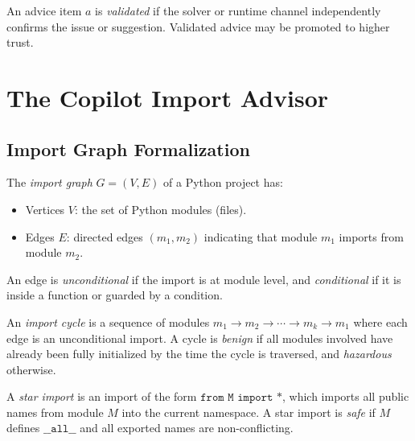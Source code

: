 \documentclass[11pt]{article}
\begin{document}
\begin{definition}
\label{def:validation}
An advice item $a$ is \emph{validated} if the solver or runtime
channel independently confirms the issue or suggestion.
Validated advice may be promoted to higher trust.
\end{definition}

\section{The Copilot Import Advisor}
\label{sec:import}

\subsection{Import Graph Formalization}
\label{sec:import:graph}

\begin{definition}
\label{def:import-graph}
The \emph{import graph} $G = (V, E)$ of a Python project has:
\begin{itemize}[leftmargin=2em]
\item Vertices $V$: the set of Python modules (files).
\item Edges $E$: directed edges $(m_1, m_2)$ indicating that
  module $m_1$ imports from module $m_2$.
\end{itemize}
An edge is \emph{unconditional} if the import is at module level,
and \emph{conditional} if it is inside a function or guarded by
a condition.
\end{definition}

\begin{definition}
\label{def:import-cycle}
An \emph{import cycle} is a sequence of modules
$m_1 \to m_2 \to \cdots \to m_k \to m_1$ where each edge
is an unconditional import.  A cycle is \emph{benign} if
all modules involved have already been fully initialized by
the time the cycle is traversed, and \emph{hazardous} otherwise.
\end{definition}

\begin{definition}
\label{def:star-import}
A \emph{star import} is an import of the form
$\texttt{from M import *}$, which imports all public names
from module $M$ into the current namespace.  A star import is
\emph{safe} if $M$ defines $\texttt{\_\_all\_\_}$ and all
exported names are non-conflicting.
\end{definition}
\end{document}
